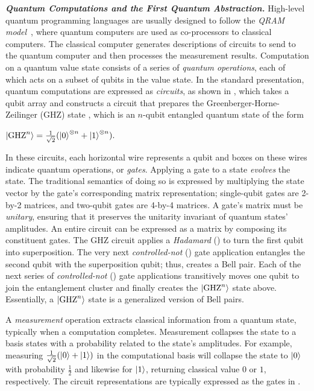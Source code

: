 \noindent\textbf{\textit{Quantum Computations and the First Quantum Abstraction.}} High-level quantum programming languages are usually designed to follow the \emph{QRAM model}~\cite{Knill1996}, where quantum computers are used as co-processors to classical computers. The classical computer generates descriptions of circuits to send to the quantum computer and then processes the measurement results.
Computation on a quantum value state consists of a series of \emph{quantum operations}, each of which acts on a subset of qubits in the value state. 
In the standard presentation, quantum computations are expressed as \emph{circuits}, as shown in ,
which takes a qubit array and constructs a circuit that prepares the Greenberger-Horne-Zeilinger (GHZ) state \cite{Greenberger1989}, which is an $n$-qubit entangled quantum state of the form
{
\begin{center}
$
    \ket{\text{GHZ}^n} = \frac{1}{\sqrt{2}}(\ket{0}^{\otimes n}+\ket{1}^{\otimes n}).
$
\end{center}
}
In these circuits, each horizontal wire represents a qubit and boxes on these wires indicate quantum operations, or \emph{gates}. 
Applying a gate to a state \emph{evolves} the state. The traditional semantics of doing so is expressed by multiplying the state vector by the gate's corresponding matrix representation; single-qubit gates are 2-by-2 matrices, and two-qubit gates are 4-by-4 matrices. A gate's matrix must be \emph{unitary}, ensuring that it preserves the unitarity invariant of quantum states' amplitudes. An entire circuit can be expressed as a matrix by composing its constituent gates.
The GHZ circuit applies a \emph{Hadamard} () to turn the first qubit into superposition. The very next \emph{controlled-not} () gate application entangles the second qubit with the superposition qubit; thus, creates a Bell pair.
Each of the next series of \emph{controlled-not} () gate applications transitively moves one qubit to join the entanglement cluster and finally creates the $\ket{\text{GHZ}^n}$ state above. Essentially, a $\ket{\text{GHZ}^n}$ state is a generalized version of Bell pairs.

A \emph{measurement} operation extracts classical information from a quantum state, typically when a computation completes. Measurement collapses the state to a basis states with a probability related to the state's amplitudes. For example, measuring $\frac{1}{\sqrt{2}}(\ket{0} + \ket{1})$ in the computational basis will collapse the state to $\ket{0}$ with probability $\frac{1}{2}$ and likewise for $\ket{1}$, returning classical value $0$ or $1$, respectively.
The circuit representations are typically expressed as the  gates in .

